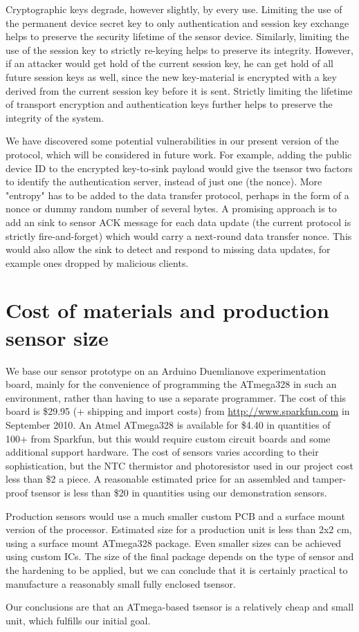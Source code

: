 Cryptographic keys degrade, however slightly, by every use. Limiting the use of the permanent device secret key to only authentication and session key exchange helps to preserve the security lifetime of the sensor device. Similarly, limiting the use of the session key to strictly re-keying helps to preserve its integrity. However, if an attacker would get hold of the current session key, he can get hold of all future session keys as well, since the new key-material is encrypted with a key derived from the current session key before it is sent. 
%
Strictly limiting the lifetime of transport encryption and authentication keys further helps to preserve the integrity of the system.

We have discovered some potential vulnerabilities in our present version of the protocol, which will be considered in future work. For example, adding the public device ID to the encrypted key-to-sink payload would give the tsensor two factors to identify the authentication server, instead of just one (the nonce). More "entropy" has to be added to the data transfer protocol, perhaps in the form of a nonce or dummy random number of several bytes. A promising approach is to add an sink to sensor ACK message for each data update (the current protocol is strictly fire-and-forget) which would carry a next-round data transfer nonce. This would also allow the sink to detect and respond to  missing data updates, for example ones dropped by malicious clients. 

\section{Cost of materials and production sensor size}

We base our sensor prototype on an Arduino Duemlianove experimentation board, mainly for the convenience of programming the ATmega328 in such an environment, rather than having to use a separate programmer. The cost of this board is \$29.95 (+ shipping and import costs) from \url{http://www.sparkfun.com} in September 2010. An Atmel ATmega328 is available for \$4.40 in quantities of 100+ from Sparkfun, but this would require custom circuit boards and some additional support hardware. The cost of sensors varies according to their sophistication, but the NTC thermistor and photoresistor used in our project cost less than \$2 a piece. A reasonable estimated price for an assembled and tamper-proof tsensor is less than \$20 in quantities using our demonstration sensors. 

Production sensors would use a much smaller custom PCB and a surface mount version of the processor. Estimated size for a production unit is less than 2x2 cm, using a surface mount ATmega328 package. Even smaller sizes can be achieved using custom ICs. The size of the final package depends on the type of sensor and the hardening to be applied, but we can conclude that it is certainly practical to manufacture a reasonably small fully enclosed tsensor. 

Our conclusions are that an ATmega-based tsensor is a relatively cheap and small unit, which fulfills our initial goal.

